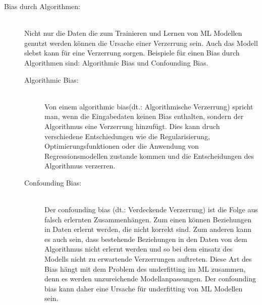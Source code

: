 \begin{onehalfspace}
\begin{description}
            \item [Bias durch Algorithmen:] \hfill \\
            Nicht nur die Daten die zum Trainieren und Lernen von \ac*{ML} Modellen genutzt werden können die Ursache einer Verzerrung sein. Auch das Modell slebst kann für eine Verzerrung sorgen. Beispiele für einen Bias durch Algorithmen sind: Algorithmic Bias und Confounding Bias.
            \begin{description}
                \item [Algorithmic Bias:] \hfill \\
                Von einem \glqq{}algorithmic bias\grqq{}(\ac*{dt}.: Algorithmische Verzerrung) spricht man, wenn die Eingabedaten keinen Bias enthalten, sondern der Algorithmus eine Verzerrung hinzufügt. Dies kann druch verschiedene Entschiedungen wie die Regularisierung, Optimierungsfunktionen oder die Anwendung von Regressionsmodellen zustande kommen und die Entscheidungen des Algorithmus verzerren.\cite{srinivasan2021biases}\cite{Mehrabi2021}
                \item [Confounding Bias:] \hfill \\
                Der \glqq{}confounding bias\grqq{} (\ac*{dt}.: Verdeckende Verzerrung) ist die Folge aus falsch erlernten Zusammenhängen. Zum einen können Beziehungen in Daten erlernt werden, die nicht korrekt sind. Zum anderen kann es auch sein, dass bestehende Beziehungen in den Daten von dem Algorithmus nicht erlernt werden und so bei dem einsatz des Modells nicht zu erwartende Verzerrungen auftreten. Diese Art des Bias hängt mit dem Problem des underfitting im \ac*{ML} zusammen, denn es werden unzureichende Modellanpassungen. Der confounding bias kann daher eine Ursache für underfitting von \ac*{ML} Modellen sein.\cite{srinivasan2021biases}
            \end{description}
                

\end{description}
\end{onehalfspace}
